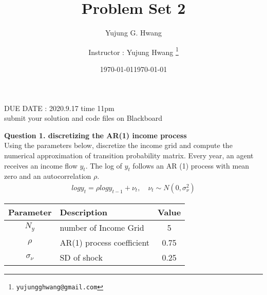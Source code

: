 \documentclass[paper=a4, fontsize=13pt]{extarticle} %
\author{Yujung G. Hwang} %
\date{\today} %
\numberwithin{equation}{section} %
\numberwithin{figure}{section} %
\numberwithin{table}{section} %
\begin{document}
\title{	
\normalfont \normalsize 
\huge Problem Set 2
}
\author{
Instructor : Yujung Hwang \thanks{\texttt{yujungghwang@gmail.com}}} %
\date{\today} %
\maketitle %

\begin{center}
DUE DATE : 2020.9.17 time 11pm \\
submit your solution and code files on Blackboard
\end{center}

\upshape \mdseries 
\normalsize

\textbf{Question 1. discretizing the AR(1) income process} \\
Using the parameters below, discretize the income grid and compute the numerical approximation of transition probability matrix. Every year, an agent receives an income flow $y_t$. The log of $y_t$ follows an AR (1) process with mean zero and an autocorrelation $\rho$. 
\begin{gather}
log y_{t} = \rho log y_{t-1} + \nu_t, \quad \nu_t \sim N(0, \sigma_{\nu}^2)
\end{gather}
\begin{table}[H]
\centering
\begin{tabular}{c l c}
\hline
Parameter & Description & Value \\
\hline
$N_y$ & number of Income Grid & 5 \\
$\rho$ & AR(1) process coefficient & 0.75 \\
$\sigma_{\nu}$ & SD of shock & 0.25 \\
\hline
\end{tabular}
\end{table}
\end{document}
